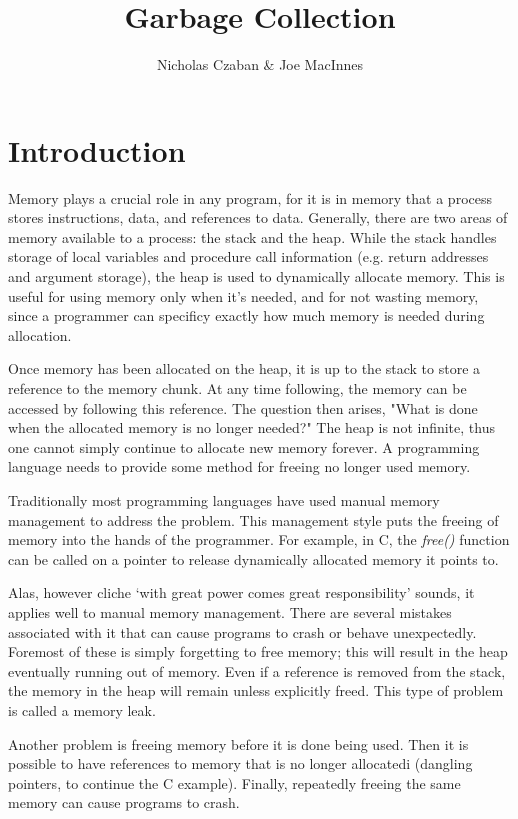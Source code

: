 \documentclass[12pt]{article}
\begin{document}
\title{Garbage Collection}
\author{Nicholas Czaban \& Joe MacInnes}
\maketitle
\section{Introduction}
Memory plays a crucial role in any program, for it is in memory that a process stores instructions, data, and references to data. Generally, there are two areas of memory available to a process: the stack and the heap. While the stack handles storage of local variables and procedure call information (e.g. return addresses and argument storage), the heap is used to dynamically allocate memory. This is useful for using memory only when it's needed, and for not wasting memory, since a programmer can specificy exactly how much memory is needed during allocation.  

Once memory has been allocated on the heap, it is up to the stack to store a reference to the memory chunk. At any time following, the memory can be accessed by following this reference. The question then arises, "What is done when the allocated memory is no longer needed?" The heap is not infinite, thus one cannot simply continue to allocate new memory forever. A programming language needs to provide some method for freeing no longer used memory.

Traditionally most programming languages have used manual memory management to address the problem. This management style puts the freeing of memory into the hands of the programmer. For example, in C, the \textit{free()} function can be called on a pointer to release dynamically allocated memory it points to.

Alas, however cliche `with great power comes great responsibility' sounds, it applies well to manual memory management. There are several mistakes associated with it that can cause programs to crash or behave unexpectedly. Foremost of these is simply forgetting to free memory; this will result in the heap eventually running out of memory. Even if a reference is removed from the stack, the memory in the heap will remain unless explicitly freed. This type of problem is called a memory leak.

Another problem is freeing memory before it is done being used. Then it is possible to have references to memory that is no longer allocatedi (dangling pointers, to continue the C example). Finally, repeatedly freeing the same memory can cause programs to crash. \cite{os_textbook}
\end{document}
